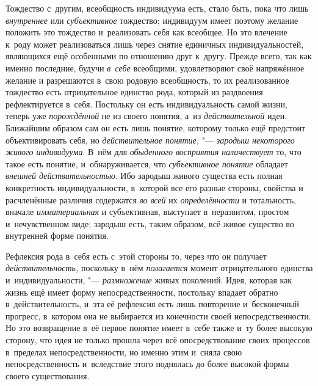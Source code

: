 Тождество с~другим, всеобщность индивидуума есть, стало быть,
пока что лишь {\em внутреннее}
или {\em субъективное}
тождество; индивидуум имеет поэтому желание положить это
тождество и~реализовать себя как всеобщее. Но это влечение к~роду может
реализоваться лишь через снятие единичных индивидуальностей, являющихся ещё
особенными по отношению друг к~другу. Прежде всего, так как именно
последние, будучи {\em в~себе}
всеобщими, удовлетворяют своё напряжённое желание и
разрешаются в~свою родовую всеобщность, то их реализованное тождество есть
отрицательное единство рода, который из раздвоения рефлектируется в~себя.
Постольку он есть индивидуальность самой жизни, теперь уже
{\em порождённой} не из
своего понятия, а~из
{\em действительной}
идеи. Ближайшим образом сам он есть лишь
понятие, которому только ещё предстоит объективировать себя, но
{\em действительное понятие,} "---
{\em зародыш некоторого живого
индивидуума}. В~нём для
{\em обыденного восприятия
наличествует} то, что такое есть понятие, и~обнаруживается,
что {\em субъективное понятие}
обладает {\em внешней
действительностью}. Ибо зародыш живого существа есть полная
конкретность индивидуальности, в~которой все его разные стороны, свойства и
расчленённые различия содержатся {\em во
всей} их
{\em определённости} и
тотальность, вначале
{\em имматериальная} и
субъективная, выступает в~неразвитом, простом и~нечувственном виде; зародыш
есть, таким образом, всё живое существо во внутренней форме понятия.

Рефлексия рода в~себя есть с~этой стороны то, через что он
получает {\em действительность,}
поскольку в~нём
{\em полагается} момент
отрицательного единства и~индивидуальности, "---
{\em размножение} живых
поколений. Идея, которая как жизнь ещё имеет форму непосредственности,
постольку впадает обратно в~действительность, и~эта её рефлексия есть лишь
повторение и~бесконечный прогресс, в~котором она не выбирается из
конечности своей непосредственности. Но это возвращение в~её первое понятие
имеет в~себе также и~ту более высокую сторону, что идея не только прошла
через всё опосредствование своих процессов в~пределах непосредственности,
но именно этим и~сняла свою непосредственность и~вследствие этого поднялась
до более высокой формы своего существования.

